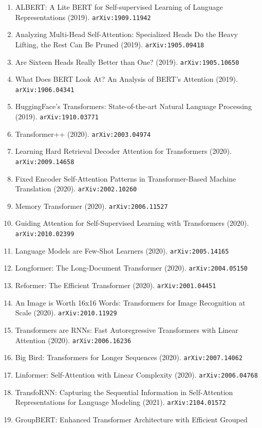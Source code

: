 \documentclass[11pt]{article}
\begin{document}
\begin{enumerate}
  Transformer (2019). \texttt{arXiv:1910.10683}
  \item ALBERT: A Lite BERT for Self-supervised Learning of Language
  Representations (2019). \texttt{arXiv:1909.11942}
  \item Analyzing Multi-Head Self-Attention: Specialized Heads Do the Heavy
  Lifting, the Rest Can Be Pruned (2019). \texttt{arXiv:1905.09418}
  \item Are Sixteen Heads Really Better than One? (2019). \texttt{arXiv:1905.10650}
  \item What Does BERT Look At? An Analysis of BERT's Attention (2019). \texttt{arXiv:1906.04341}
  \item HuggingFace's Transformers: State-of-the-art Natural Language Processing (2019). \texttt{arXiv:1910.03771}
  \item Transformer++ (2020). \texttt{arXiv:2003.04974}
  \item Learning Hard Retrieval Decoder Attention for Transformers (2020). \texttt{arXiv:2009.14658}
  \item Fixed Encoder Self-Attention Patterns in Transformer-Based Machine
  Translation (2020). \texttt{arXiv:2002.10260}
  \item Memory Transformer (2020). \texttt{arXiv:2006.11527}
  \item Guiding Attention for Self-Supervised Learning with Transformers (2020). \texttt{arXiv:2010.02399}
  \item Language Models are Few-Shot Learners (2020). \texttt{arXiv:2005.14165}
  \item Longformer: The Long-Document Transformer (2020). \texttt{arXiv:2004.05150}
  \item Reformer: The Efficient Transformer (2020). \texttt{arXiv:2001.04451}
  \item An Image is Worth 16x16 Words: Transformers for Image Recognition at
  Scale (2020). \texttt{arXiv:2010.11929}
  \item Transformers are RNNs: Fast Autoregressive Transformers with Linear
  Attention (2020). \texttt{arXiv:2006.16236}
  \item Big Bird: Transformers for Longer Sequences (2020). \texttt{arXiv:2007.14062}
  \item Linformer: Self-Attention with Linear Complexity (2020). \texttt{arXiv:2006.04768}
  \item TransfoRNN: Capturing the Sequential Information in Self-Attention
  Representations for Language Modeling (2021). \texttt{arXiv:2104.01572}
  \item GroupBERT: Enhanced Transformer Architecture with Efficient Grouped

\end{enumerate}
\end{document}
